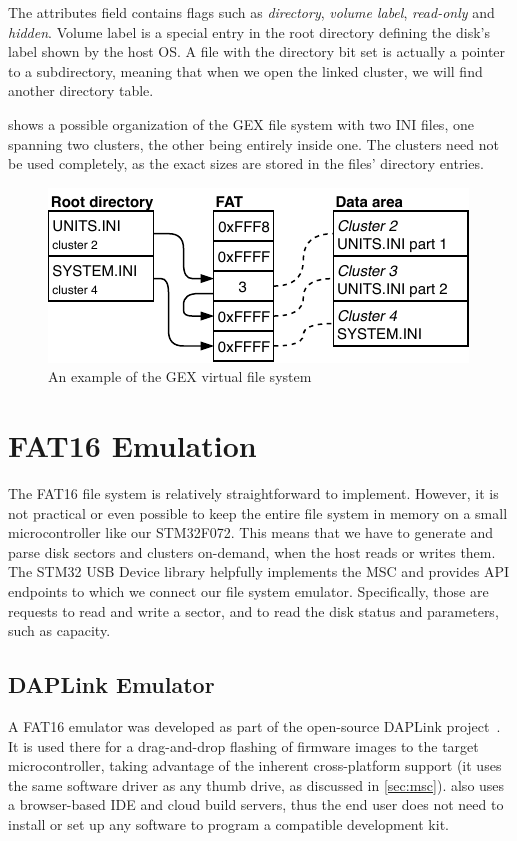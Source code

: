 The attributes field contains flags such as \textit{directory}, \textit{volume label}, \textit{read-only} and \textit{hidden}. Volume label is a special entry in the root directory defining the disk's label shown by the host \gls{OS}. A file with the directory bit set is actually a pointer to a subdirectory, meaning that when we open the linked cluster, we will find another directory table.

 shows a possible organization of the GEX file system with two INI files, one spanning two clusters, the other being entirely inside one. The clusters need not be used completely, as the exact sizes are stored in the files' directory entries.

\begin{figure}[h]
	\centering
	\includegraphics[scale=1.3] {img/fat-links.pdf}
	\caption{\label{fig:fat_example}An example of the GEX virtual file system}
\end{figure}


\section{FAT16 Emulation}

The FAT16 file system is relatively straightforward to implement. However, it is not practical or even possible to keep the entire file system in memory on a small microcontroller like our STM32F072. This means that we have to generate and parse disk sectors and clusters on-demand, when the host reads or writes them. The STM32 \gls{USB} Device library helpfully implements the \gls{MSC} and provides \gls{API} endpoints to which we connect our file system emulator. Specifically, those are requests to read and write a sector, and to read the disk status and parameters, such as capacity.

\subsection{DAPLink Emulator}

A FAT16 emulator was developed as part of the open-source \mbed DAPLink project~\cite{daplink}. It is used there for a drag-and-drop flashing of firmware images to the target microcontroller, taking advantage of the inherent cross-platform support (it uses the same software driver as any thumb drive, as discussed in \cref{sec:msc}). \mbed also uses a browser-based \gls{IDE} and cloud build servers, thus the end user does not need to install or set up any software to program a compatible development kit. 

